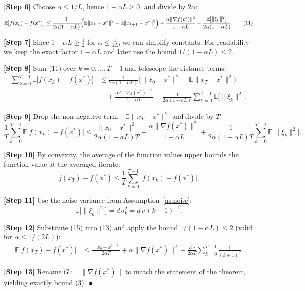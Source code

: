 \documentclass{article}
\newcommand{\E}{\mathbb{E}}
\begin{document}
\noindent\textbf{[Step 6]} Choose $\alpha\le 1/L$, hence $1-\alpha L\ge0$, and divide by $2\alpha$:
\[
\E\!\bigl[f(x_{k})-f(x^{*})\bigr]
\le
\frac{1}{2\alpha(1-\alpha L)}\Bigl(\E\|x_{k}-x^{*}\|^{2}
-\E\|x_{k+1}-x^{*}\|^{2}\Bigr)
+\frac{\alpha\|\nabla f(x^{*})\|^{2}}{1-\alpha L}
+\frac{\E\!\bigl[\|\xi_{k}\|^{2}\bigr]}{2\alpha(1-\alpha L)} .
\tag{11}
\]

\noindent\textbf{[Step 7]} Since $1-\alpha L\ge \tfrac12$ for $\alpha\le \tfrac1{2L}$, we can simplify constants. For readability we keep the exact factor $1-\alpha L$ and later use the bound $1/(1-\alpha L)\le 2$.

\noindent\textbf{[Step 8]} Sum (11) over $k=0,\dots,T-1$ and telescope the distance terms:
\[
\begin{aligned}
\sum_{k=0}^{T-1}\E\!\bigl[f(x_{k})-f(x^{*})\bigr]
&\le
\frac{1}{2\alpha(1-\alpha L)}\bigl(\|x_{0}-x^{*}\|^{2}
-\E\|x_{T}-x^{*}\|^{2}\bigr)\\
&\quad +\frac{\alpha T\|\nabla f(x^{*})\|^{2}}{1-\alpha L}
+\frac{1}{2\alpha(1-\alpha L)}\sum_{k=0}^{T-1}\E\!\bigl[\|\xi_{k}\|^{2}\bigr].
\end{aligned}
\tag{12}
\]

\noindent\textbf{[Step 9]} Drop the non‑negative term $-\E\|x_{T}-x^{*}\|^{2}$ and divide by $T$:
\[
\frac{1}{T}\sum_{k=0}^{T-1}\E\!\bigl[f(x_{k})-f(x^{*})\bigr]
\le
\frac{\|x_{0}-x^{*}\|^{2}}{2\alpha(1-\alpha L)T}
+\frac{\alpha\|\nabla f(x^{*})\|^{2}}{1-\alpha L}
+\frac{1}{2\alpha(1-\alpha L)T}\sum_{k=0}^{T-1}\E\!\bigl[\|\xi_{k}\|^{2}\bigr].
\tag{13}
\]

\noindent\textbf{[Step 10]} By convexity, the average of the function values upper bounds the function value at the averaged iterate:
\[
f(\bar x_{T})-f(x^{*})\le\frac{1}{T}\sum_{k=0}^{T-1}\bigl[f(x_{k})-f(x^{*})\bigr].
\tag{14}
\]

\noindent\textbf{[Step 11]} Use the noise variance from Assumption~\ref{as:noise}:
\[
\E\!\bigl[\|\xi_{k}\|^{2}\bigr]=d\,\sigma_{k}^{2}=d\,c\,(k+1)^{-\beta}.
\tag{15}
\]

\noindent\textbf{[Step 12]} Substitute (15) into (13) and apply the bound $1/(1-\alpha L)\le 2$ (valid for $\alpha\le 1/(2L)$):
\[
\begin{aligned}
\E\!\bigl[f(\bar x_{T})-f(x^{*})\bigr]
&\le
\frac{\|x_{0}-x^{*}\|^{2}}{2\alpha T}
+\alpha\|\nabla f(x^{*})\|^{2}
+\frac{d\,c}{2\alpha T}\sum_{k=0}^{T-1}\frac{1}{(k+1)^{\beta}} .
\end{aligned}
\tag{16}
\]

\noindent\textbf{[Step 13]} Rename $G:=\|\nabla f(x^{*})\|$ to match the statement of the theorem, yielding exactly bound (3). ∎
\end{document}
